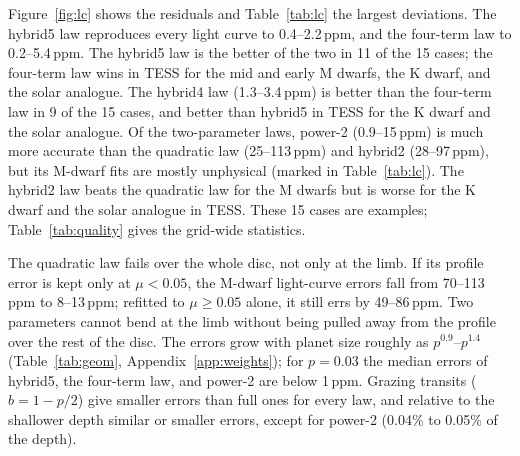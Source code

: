 \documentclass{aa}
\newcommand{\ppm}{\,\textrm{ppm}}
\begin{document}
Figure~\ref{fig:lc} shows the residuals and Table~\ref{tab:lc} the largest
deviations. The hybrid5 law reproduces every light curve to 0.4--2.2\ppm, and
the four-term law to 0.2--5.4\ppm. The hybrid5 law is the better of the two in
11 of the 15 cases; the four-term law wins in TESS for the mid and early M
dwarfs, the K dwarf, and the solar analogue. The hybrid4 law (1.3--3.4\ppm)
is better than the four-term law in 9 of the 15 cases, and better than hybrid5
in TESS for the K dwarf and the solar analogue. Of the two-parameter laws,
power-2 (0.9--15\ppm) is much more accurate than the quadratic law
(25--113\ppm) and hybrid2 (28--97\ppm), but its M-dwarf fits are mostly
unphysical (marked in Table~\ref{tab:lc}). The hybrid2 law beats the
quadratic law for the M dwarfs but is worse for the K dwarf and the solar
analogue in TESS. These 15 cases are examples; Table~\ref{tab:quality} gives
the grid-wide statistics.

The quadratic law fails over the whole disc, not only at the limb. If its
profile error is kept only at $\mu<0.05$, the M-dwarf light-curve errors fall
from 70--113\ppm{} to 8--13\ppm; refitted to $\mu\ge0.05$ alone, it still errs
by 49--86\ppm. Two parameters cannot bend at the limb without being pulled away
from the profile over the rest of the disc. The errors grow with planet size
roughly as $p^{0.9}$--$p^{1.4}$ (Table~\ref{tab:geom},
Appendix~\ref{app:weights}); for $p=0.03$ the median errors of hybrid5, the
four-term law, and power-2 are below 1\ppm. Grazing transits ($b=1-p/2$) give
smaller errors than full ones for every law, and relative to the shallower
depth similar or smaller errors, except for power-2 (0.04\% to 0.05\% of the
depth).
\end{document}
